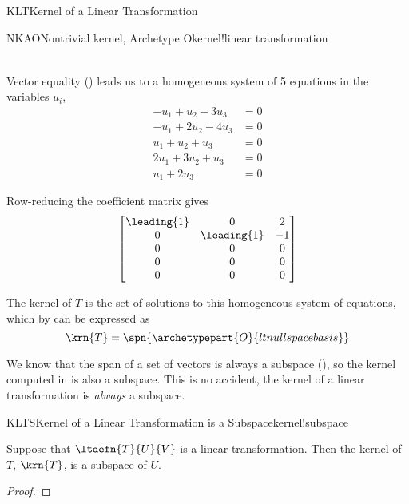\begin{subsect}{KLT}{Kernel of a Linear Transformation}
\begin{example}{NKAO}{Nontrivial kernel, Archetype O}{kernel!linear transformation}
\begin{para}
\begin{align*}
%
\end{align*}
\end{para}
%
\begin{para}Vector equality () leads us to a homogeneous system of 5 equations in the variables $u_i$,
%
\begin{align*}
-u_1 + u_2 - 3 u_3&=0\\
-u_1 + 2 u_2 - 4 u_3&=0\\
u_1 + u_2 + u_3&=0\\
2 u_1 + 3 u_2 + u_3&=0\\
u_1 + 2 u_3&=0
\end{align*}
\end{para}
%
\begin{para}Row-reducing the coefficient matrix gives
%
\begin{equation*}
\begin{bmatrix}
\leading{1} & 0 & 2\\
0 & \leading{1} & -1\\
0 & 0 & 0\\
0 & 0 & 0\\
0 & 0 & 0
\end{bmatrix}
\end{equation*}
\end{para}
%
\begin{para}The kernel of $T$ is the set of solutions to this homogeneous system of equations, which by  can be expressed as
%
\begin{equation*}
\krn{T}=\spn{\archetypepart{O}{ltnullspacebasis}}\end{equation*}
\end{para}
%
\end{example}
%
\begin{para}We know that the span of a set of vectors is always a subspace (), so the kernel computed in  is also a subspace.  This is no accident, the kernel of a linear transformation is {\em always} a subspace.\end{para}
%
\begin{theorem}{KLTS}{Kernel of a Linear Transformation is a Subspace}{kernel!subspace}
\begin{para}Suppose that $\ltdefn{T}{U}{V}$ is a linear transformation.  Then the kernel of $T$, $\krn{T}$, is a subspace of $U$.\end{para}
\end{theorem}
%
\begin{proof}

\end{proof}
\end{subsect}
